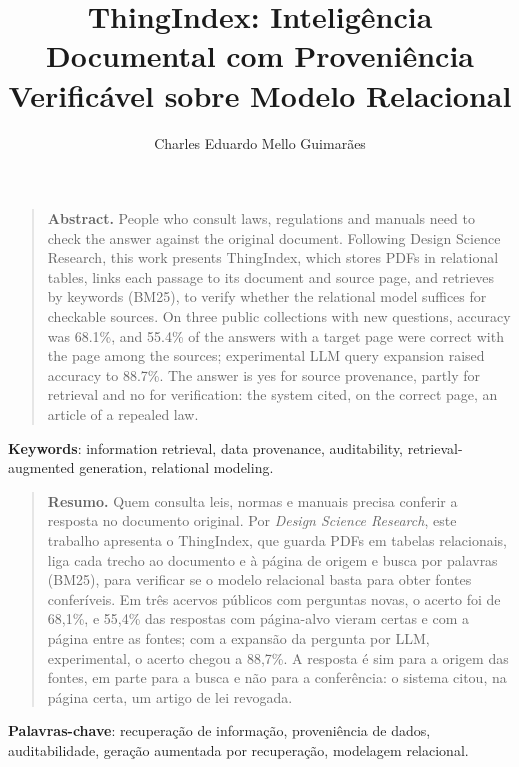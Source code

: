 \documentclass[12pt]{article}
\title{ThingIndex: Inteligência Documental com Proveniência\\ Verificável sobre Modelo Relacional}
\author{Charles Eduardo Mello Guimarães\inst{1}}
\makeatletter
\newcommand{\thingindex@address}{}
\renewcommand{\maketitle}{
    \begin{center}
      {\bfseries\LARGE \@title\par}
      \vspace{12pt}
      {\normalsize\bfseries \@author\par}
      \vspace{12pt}
      {\normalsize \thingindex@address\par}
    \end{center}
    \vspace{12pt}
  }
\newenvironment{resumo}
    {\begin{quote}\noindent\textbf{Resumo. }}
    {\end{quote}}
\renewenvironment{abstract}
    {\begin{quote}\noindent\textbf{Abstract. }}
    {\end{quote}}
\makeatother
\begin{document}
\maketitle

\begin{abstract}
People who consult laws, regulations and manuals need to check the answer against the original document. Following Design Science Research, this work presents ThingIndex, which stores PDFs in relational tables, links each passage to its document and source page, and retrieves by keywords (BM25), to verify whether the relational model suffices for checkable sources. On three public collections with new questions, accuracy was 68.1\%, and 55.4\% of the answers with a target page were correct with the page among the sources; experimental LLM query expansion raised accuracy to 88.7\%. The answer is yes for source provenance, partly for retrieval and no for verification: the system cited, on the correct page, an article of a repealed law.
\end{abstract}

\noindent\textbf{Keywords}: information retrieval, data provenance, auditability, retrieval-augmented generation, relational modeling.

\begin{resumo}
Quem consulta leis, normas e manuais precisa conferir a resposta no documento original. Por \emph{Design Science Research}, este trabalho apresenta o ThingIndex, que guarda PDFs em tabelas relacionais, liga cada trecho ao documento e à página de origem e busca por palavras (BM25), para verificar se o modelo relacional basta para obter fontes conferíveis. Em três acervos públicos com perguntas novas, o acerto foi de 68,1\%, e 55,4\% das respostas com página-alvo vieram certas e com a página entre as fontes; com a expansão da pergunta por LLM, experimental, o acerto chegou a 88,7\%. A resposta é sim para a origem das fontes, em parte para a busca e não para a conferência: o sistema citou, na página certa, um artigo de lei revogada.
\end{resumo}

\noindent\textbf{Palavras-chave}: recuperação de informação, proveniência de dados, auditabilidade, geração aumentada por recuperação, modelagem relacional.


\end{document}
